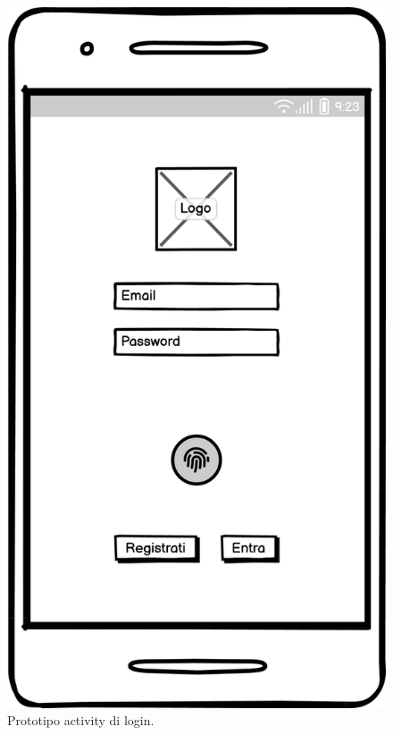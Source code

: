 \documentclass[a4paper,final,12pt]{report}
\begin{document}
\begin{figure}[hbtp]
\centering
\includegraphics[scale=0.30]{img_concettuale/LoginMobile.png}
\caption{Prototipo activity di login.}
\end{figure}
\end{document}
